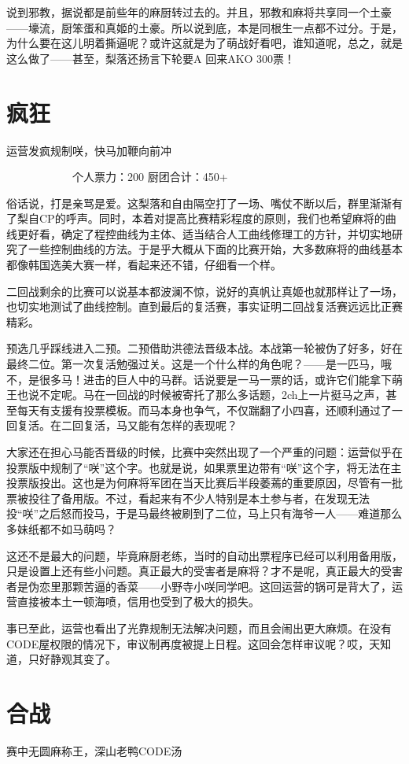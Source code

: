 说到邪教，据说都是前些年的麻厨转过去的。并且，邪教和麻将共享同一个土豪——壕流，厨笨蛋和真姬的土豪。所以说到底，本是同根生一点都不过分。于是，为什么要在这儿明着撕逼呢？或许这就是为了萌战好看吧，谁知道呢，总之，就是这么做了——甚至，梨落还扬言下轮要A 回来AKO 300票！


\section{疯狂}
运营发疯规制咲，快马加鞭向前冲

　　　　　　个人票力：200 厨团合计：450+

俗话说，打是亲骂是爱。这梨落和自由隔空打了一场、嘴仗不断以后，群里渐渐有了梨自CP的呼声。同时，本着对提高比赛精彩程度的原则，我们也希望麻将的曲线更好看，确定了程控曲线为主体、适当结合人工曲线修理工的方针，并切实地研究了一些控制曲线的方法。于是乎大概从下面的比赛开始，大多数麻将的曲线基本都像韩国选美大赛一样，看起来还不错，仔细看一个样。

二回战剩余的比赛可以说基本都波澜不惊，说好的真帆让真姬也就那样让了一场，也切实地测试了曲线控制。直到最后的复活赛，事实证明二回战复活赛远远比正赛精彩。

预选几乎踩线进入二预。二预借助洪德法晋级本战。本战第一轮被伪了好多，好在最终二位。第一次复活勉强过关。这是一个什么样的角色呢？——是一匹马，哦不，是很多马！进击的巨人中的马群。话说要是一马一票的话，或许它们能拿下萌王也说不定呢。马在一回战的时候被寄托了那么多话题，2ch上一片挺马之声，甚至每天有支援有投票模板。而马本身也争气，不仅踹翻了小四喜，还顺利通过了一回复活。在二回复活，马又能有怎样的表现呢？

大家还在担心马能否晋级的时候，比赛中突然出现了一个严重的问题：运营似乎在投票版中规制了“咲”这个字。也就是说，如果票里边带有“咲”这个字，将无法在主投票版投出。这也是为何麻将军团在当天比赛后半段萎蔫的重要原因，尽管有一批票被投往了备用版。不过，看起来有不少人特别是本土参与者，在发现无法投“咲”之后怒而投马，于是马最终被刷到了二位，马上只有海爷一人——难道那么多妹纸都不如马萌吗？

这还不是最大的问题，毕竟麻厨老练，当时的自动出票程序已经可以利用备用版，只是设置上还有些小问题。真正最大的受害者是麻将？才不是呢，真正最大的受害者是伪恋里那颗苦逼的香菜——小野寺小咲同学吧。这回运营的锅可是背大了，运营直接被本土一顿海喷，信用也受到了极大的损失。

事已至此，运营也看出了光靠规制无法解决问题，而且会闹出更大麻烦。在没有CODE屋权限的情况下，审议制再度被提上日程。这回会怎样审议呢？哎，天知道，只好静观其变了。


\section{合战}
赛中无圆麻称王，深山老鸭CODE汤

